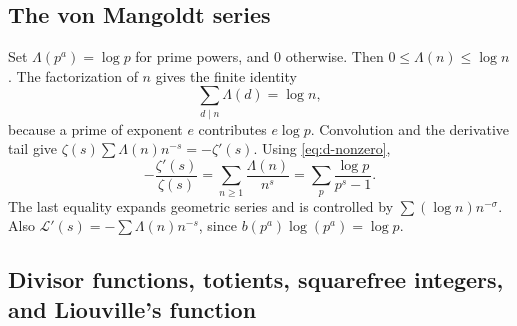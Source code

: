 \subsection{The von Mangoldt series}

Set \(\Lambda(p^a)=\log p\) for prime powers, and \(0\) otherwise.
Then \(0\leq\Lambda(n)\leq\log n\).
The factorization of \(n\) gives the finite identity
\[
                    \sum_{d\mid n}\Lambda(d)=\log n,  \tag{D13}\label{eq:d-mangoldt-conv}
\]
because a prime of exponent \(e\) contributes \(e\log p\).
Convolution and the derivative tail give
\(\zeta(s)\sum\Lambda(n)n^{-s}=-\zeta'(s)\).
Using \eqref{eq:d-nonzero},
\[
 -\frac{\zeta'(s)}{\zeta(s)}
   =\sum_{n\geq1}\frac{\Lambda(n)}{n^s}
   =\sum_p\frac{\log p}{p^s-1}.                        \tag{D14}\label{eq:d-log-derivative}
\]
The last equality expands geometric series and is controlled by
\(\sum(\log n)n^{-\sigma}\).
Also \(\mathcal L'(s)=-\sum\Lambda(n)n^{-s}\), since
\(b(p^a)\log(p^a)=\log p\).

\subsection{Divisor functions, totients, squarefree integers, and Liouville's function}

